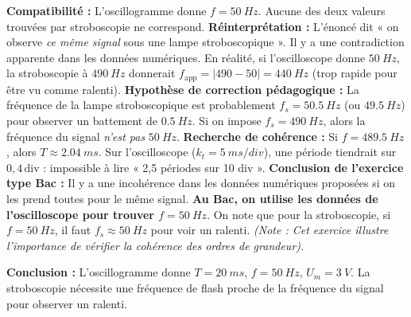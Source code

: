 \documentclass[11pt]{article}
\begin{document}
\begin{exoresolu}
\begin{enumerate}
    \textbf{Compatibilité :} L'oscillogramme donne $f = \SI{50}{Hz}$. Aucune des deux valeurs trouvées par stroboscopie ne correspond.
    \textbf{Réinterprétation :} L'énoncé dit « on observe \emph{ce même signal} sous une lampe stroboscopique ». Il y a une contradiction apparente dans les données numériques. En réalité, si l'oscilloscope donne $\SI{50}{Hz}$, la stroboscopie à $\SI{490}{Hz}$ donnerait $f_{\text{app}} = |490-50| = \SI{440}{Hz}$ (trop rapide pour être vu comme ralenti).
    \textbf{Hypothèse de correction pédagogique :} La fréquence de la lampe stroboscopique est probablement $f_s = \SI{50,5}{Hz}$ (ou $\SI{49,5}{Hz}$) pour observer un battement de $\SI{0,5}{Hz}$. Si on impose $f_s = \SI{490}{Hz}$, alors la fréquence du signal \emph{n'est pas} $\SI{50}{Hz}$.
    \textbf{Recherche de cohérence :} Si $f = \SI{489,5}{Hz}$, alors $T \approx \SI{2,04}{ms}$. Sur l'oscilloscope ($k_t=\SI{5}{ms/div}$), une période tiendrait sur $0,4\,\text{div}$ : impossible à lire « 2,5 périodes sur 10 div ».
    \textbf{Conclusion de l'exercice type Bac :} Il y a une incohérence dans les données numériques proposées si on les prend toutes pour le même signal. \textbf{Au Bac, on utilise les données de l'oscilloscope pour trouver $f=\SI{50}{Hz}$}. On note que pour la stroboscopie, si $f=\SI{50}{Hz}$, il faut $f_s \approx \SI{50}{Hz}$ pour voir un ralenti.
    \textit{(Note : Cet exercice illustre l'importance de vérifier la cohérence des ordres de grandeur).}
\end{enumerate}
\textbf{Conclusion :} L'oscillogramme donne $T=\SI{20}{ms}$, $f=\SI{50}{Hz}$, $U_m=\SI{3}{V}$. La stroboscopie nécessite une fréquence de flash proche de la fréquence du signal pour observer un ralenti.
\end{exoresolu}
\end{document}
